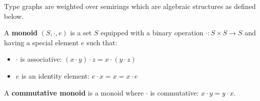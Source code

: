 Type graphs are weighted over semirings which are algebraic structures as defined below.
\begin{definition} 
    A \textbf{monoid} $(S, \cdot, e)$ is a set $S$ equipped with a binary operation $\cdot : S \times S \rightarrow S$ and having a special element $e$ such that:
    \begin{itemize}
        \item {$\cdot$ is associative:} $ (x \cdot y) \cdot z = x \cdot (y \cdot z)$
        \item {$e$ is an identity element:} $  e \cdot x = x = x \cdot e$
    \end{itemize}
    A \textbf{commutative monoid} is a monoid where $\cdot$ is commutative: $x \cdot y = y \cdot x$.
\end{definition}

